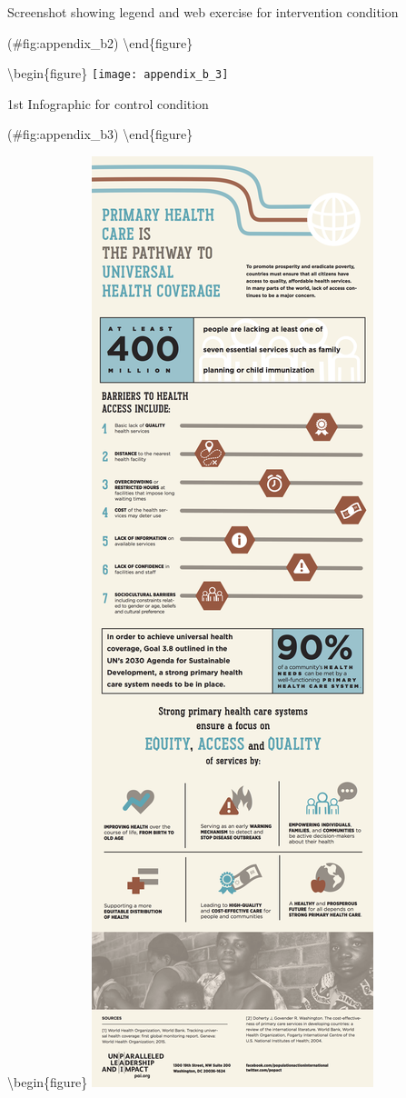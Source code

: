 \documentclass[
  english,
  man]{apa6}
\begin{document}
\caption{Screenshot showing legend and web exercise for intervention condition}

(\#fig:appendix\_b2)
\textbackslash end\{figure\}

\textbackslash begin\{figure\}
\texttt{[image: appendix\_b\_3]}

\caption{1st Infographic for control condition}

(\#fig:appendix\_b3)
\textbackslash end\{figure\}

\textbackslash begin\{figure\}
\includegraphics[width=1\linewidth]{appendix_b_4}
\end{document}
